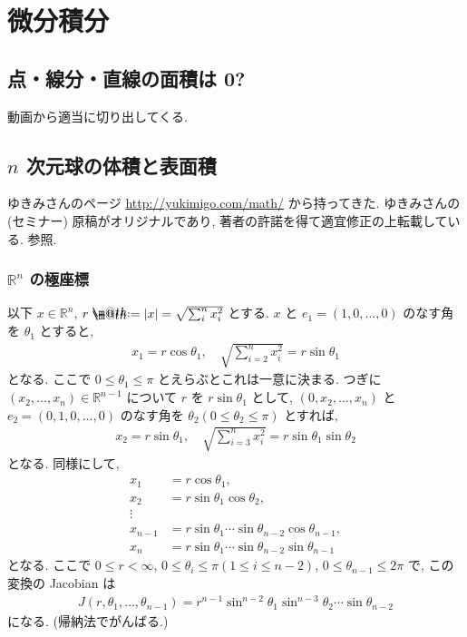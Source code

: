 \documentclass[openany, a4paper, oneside]{jsbook}
\makeatletter
\newcommand*{\defeq}{\mathrel{\rlap{%
\raisebox{0.3ex}{$\m@th\cdot$}}%
\raisebox{-0.3ex}{$\m@th\cdot$}}%
=}
\theoremstyle{break}
\theoremstyle{breakdefn}
\newcommand{\abs}[1]{\left|#1\right|}
\newcommand{\bbR}{\mathbb{R}}
\newcommand{\bbRn}{\mathbb{R}^n}
\makeatother
\begin{document}
\part{微分積分}

\chapter{点・線分・直線の面積は 0?}


動画から適当に切り出してくる.
\chapter{$n$ 次元球の体積と表面積\label{calculus-n-sphere-volume-surface-area0}}


ゆきみさんのページ \href{http://yukimigo.com/math/}{http://yukimigo.com/math/} から持ってきた.
ゆきみさんの (セミナー) 原稿がオリジナルであり, 著者の許諾を得て適宜修正の上転載している.
\cite{MitsuoSugiura1, MitsuoSugiura2} 参照.
\section{$\bbRn$ の極座標}


以下 $x \in \bbRn$, $r \defeq \abs{x} = \sqrt{\sum_i^n x_i^2}$ とする.
$x$ と $e_1 = (1, 0, \dots, 0)$ のなす角を $\theta_1$ とすると,
\begin{align}
 x_1
 =
 r \cos \theta_1, \quad
 \sqrt{\sum_{i=2}^n x_i^2}
 =
 r \sin \theta_1
\end{align}
となる.
ここで $0 \le \theta_1 \le \pi$ とえらぶとこれは一意に決まる.
つぎに $(x_2, \dots , x_n) \in \bbR^{n-1}$ について
$r$ を $r \sin \theta_1$ として, $(0, x_2, \dots, x_n)$ と
$e_2 = (0, 1, 0, \dots, 0)$ のなす角を $\theta_2 (0 \le \theta_2 \le \pi)$ とすれば,
\begin{align}
 x_2
 =
 r \sin \theta_1, \quad
 \sqrt{\sum_{i=3}^n x_i^2}
 =
 r\sin \theta_1 \sin \theta_2
\end{align}
となる.
同様にして,
\begin{align}
 x_1
 &=
 r\cos \theta_1, \\
 x_2
 &=
 r\sin \theta_1\cos \theta_2, \\
 \vdots \\
 x_{n-1}
 &=
 r\sin \theta_1 \cdots \sin \theta_{n-2} \cos \theta_{n-1}, \\
 x_n
 &=
 r\sin \theta_1 \cdots \sin \theta_{n-2} \sin \theta_{n-1}
\end{align}
となる.
ここで $0 \le r < \infty$,  $0 \le \theta_i \le \pi (1 \le i \le n-2)$,
$0 \le \theta_{n-1} \le 2\pi$ で, この変換の Jacobian は
\begin{align}
 J(r, \theta_1, \dots, \theta_{n-1})
 =
 r^{n-1} \sin^{n-2} \theta_1 \sin^{n-3}\theta_2 \cdots \sin \theta_{n-2}
\end{align}
になる. (帰納法でがんばる.)
\end{document}
